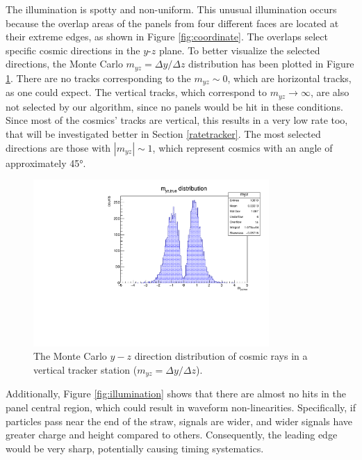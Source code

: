 The illumination is spotty and non-uniform. This unusual 
illumination occurs because the overlap areas of the 
panels from four different faces are located at their 
extreme edges, as shown in Figure \ref{fig:coordinate}. 
The overlaps select specific cosmic directions in the 
$y$-$z$ plane. 
To better visualize the selected directions, the Monte 
Carlo $m_{yz}=\Delta y /\Delta z$ distribution has been 
plotted in Figure \ref{fig:myz}.
There are no tracks corresponding to the $m_{yz}\sim 0$, 
which are horizontal tracks, as one could expect. The 
vertical tracks, 
which correspond to $m_{yz} \rightarrow \infty$, are also 
not selected by our algorithm, since no panels would be 
hit in these conditions. Since most of the cosmics' tracks 
are vertical, 
this results in a very low rate too, that will be investigated 
better in Section \ref{ratetracker}. The most selected 
directions are those with $|m_{yz}| \sim 1$, which represent 
cosmics with 
an angle of approximately 45°.
\begin{figure}[!h]
    \centering
    \includegraphics[width =0.8\textwidth]{figures/pdf/myz.pdf}
    \caption[The Monte Carlo $y-z$ direction distribution.]{The Monte Carlo $y-z$ direction distribution of cosmic rays in a vertical tracker station ($m_{yz}=\Delta y /\Delta z$).}
    \label{fig:myz}
\end{figure}

Additionally, Figure \ref{fig:illumination} shows that there are almost no hits in the panel central region, which could result in waveform non-linearities.
Specifically, if particles pass near the end of the straw, signals are wider, and wider signals have greater charge and 
height compared to others. Consequently, the leading edge would be very sharp, potentially causing timing systematics.

